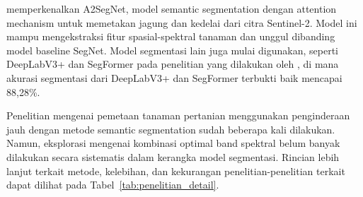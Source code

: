 \cite{gao2023} memperkenalkan A2SegNet, model semantic segmentation dengan attention mechanism untuk memetakan jagung dan kedelai dari citra Sentinel-2. Model ini mampu mengekstraksi fitur spasial-spektral tanaman dan unggul dibanding model baseline SegNet. Model segmentasi lain juga mulai digunakan, seperti DeepLabV3+ dan SegFormer pada penelitian yang dilakukan oleh \cite{li2023}, di mana akurasi segmentasi dari DeepLabV3+ dan SegFormer terbukti baik mencapai 88,28\%.

Penelitian mengenai pemetaan tanaman pertanian menggunakan penginderaan jauh dengan metode semantic segmentation sudah beberapa kali dilakukan. Namun, eksplorasi mengenai kombinasi optimal band spektral belum banyak dilakukan secara sistematis dalam kerangka model segmentasi. Rincian lebih lanjut terkait metode, kelebihan, dan kekurangan penelitian-penelitian terkait dapat dilihat pada Tabel~\ref{tab:penelitian_detail}.

